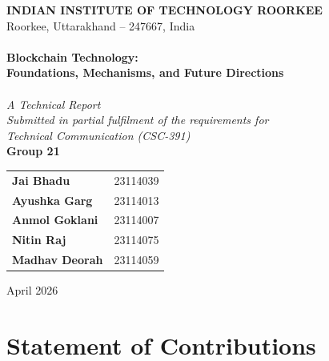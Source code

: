 
\begin{titlepage}
\begin{center}

\vspace*{1cm}
{\large \textbf{INDIAN INSTITUTE OF TECHNOLOGY ROORKEE}}\\[0.3cm]
{\small Roorkee, Uttarakhand -- 247667, India}\\[1.5cm]

\HRule \\[0.6cm]
{\LARGE \textbf{Blockchain Technology:}}\\[0.3cm]
{\LARGE \textbf{Foundations, Mechanisms, and Future Directions}}\\[0.4cm]
\HRule \\[1.5cm]

{\large \textit{A Technical Report}}\\[0.5cm]
{\large \textit{Submitted in partial fulfilment of the requirements for}}\\[0.2cm]
{\large \textit{Technical Communication (CSC-391)}}\\[2cm]

{\large \textbf{Group 21}}\\[0.6cm]

\begin{tabular}{l l}
\textbf{Jai Bhadu}     & 23114039 \\[0.15cm]
\textbf{Ayushka Garg}  & 23114013 \\[0.15cm]
\textbf{Anmol Goklani} & 23114007 \\[0.15cm]
\textbf{Nitin Raj}     & 23114075 \\[0.15cm]
\textbf{Madhav Deorah} & 23114059 \\
\end{tabular}

\vfill
{\large April 2026}

\end{center}
\end{titlepage}

\clearpage
\thispagestyle{plain}
\chapter*{Statement of Contributions}

